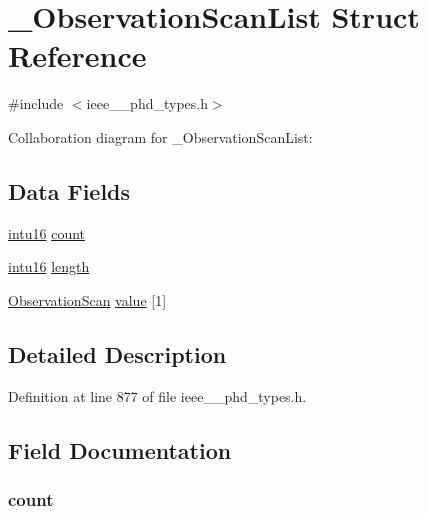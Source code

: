 \hypertarget{struct___observation_scan_list}{}\section{\+\_\+\+Observation\+Scan\+List Struct Reference}
\label{struct___observation_scan_list}


{\ttfamily \#include $<$ieee\+\_\+\_\+phd\+\_\+types.\+h$>$}



Collaboration diagram for \+\_\+\+Observation\+Scan\+List\+:
\subsection*{Data Fields}
\begin{DoxyCompactItemize}
\item 
\hyperlink{ieee__11073__phd__types_8h_a3561595d2aa7416532e1c9910abd076d}{intu16} \hyperlink{struct___observation_scan_list_abf6db060ae8e224764b0f867fb135ecd}{count}
\item 
\hyperlink{ieee__11073__phd__types_8h_a3561595d2aa7416532e1c9910abd076d}{intu16} \hyperlink{struct___observation_scan_list_a3743679e4ff85e3e1b3fc2e59973fbb3}{length}
\item 
\hyperlink{ieee__11073__phd__types_8h_a20df7fbbf480549a598f5f07a6d68403}{Observation\+Scan} \hyperlink{struct___observation_scan_list_ab21069b7802894255681620a1188de4e}{value} \mbox{[}1\mbox{]}
\end{DoxyCompactItemize}


\subsection{Detailed Description}


Definition at line 877 of file ieee\+\_\+\_\+phd\+\_\+types.\+h.



\subsection{Field Documentation}
\hypertarget{struct___observation_scan_list_abf6db060ae8e224764b0f867fb135ecd}{}
\subsubsection[{count}]{ count}\label{struct___observation_scan_list_abf6db060ae8e224764b0f867fb135ecd}


